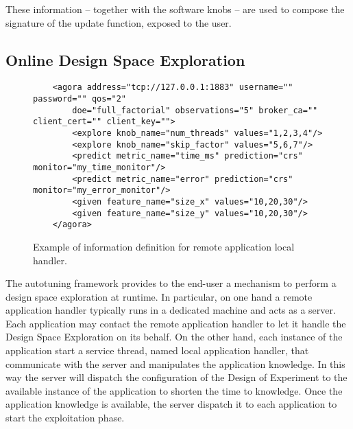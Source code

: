 These information -- together with the software knobs --  are used to compose the signature of the update function, exposed to the user.



\subsection{Online Design Space Exploration}
\label{ssec:agora}


\begin{figure}
	\lstset{language=XML}
	\begin{lstlisting}
	<agora address="tcp://127.0.0.1:1883" username="" password="" qos="2"
        doe="full_factorial" observations="5" broker_ca="" client_cert="" client_key="">
		<explore knob_name="num_threads" values="1,2,3,4"/>
		<explore knob_name="skip_factor" values="5,6,7"/>
		<predict metric_name="time_ms" prediction="crs" monitor="my_time_monitor"/>
		<predict metric_name="error" prediction="crs" monitor="my_error_monitor"/>
		<given feature_name="size_x" values="10,20,30"/>
		<given feature_name="size_y" values="10,20,30"/>
	</agora>
	\end{lstlisting}
	\caption{Example of information definition for remote application local handler.}
	\label{code:agora_xml}
\end{figure}

The autotuning framework provides to the end-user a mechanism to perform a design space exploration at runtime.
In particular, on one hand a remote application handler typically runs in a dedicated machine and acts as a server.
Each application may contact the remote application handler to let it handle the Design Space Exploration on its behalf.
On the other hand, each instance of the application start a service thread, named local application handler, that communicate with the server and manipulates the application knowledge.
In this way the server will dispatch the configuration of the Design of Experiment to the available instance of the application to shorten the time to knowledge.
Once the application knowledge is available, the server dispatch it to each application to start the exploitation phase.

